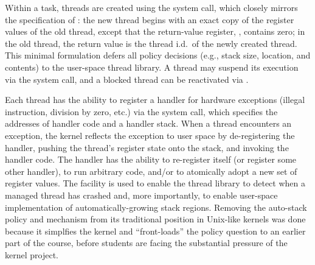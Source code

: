 Within a task, threads are created using the
 system call, which closely
mirrors the specification of :
the new thread begins with an exact copy of the
register values of the old thread, except that
the return-value register, , contains
zero;
in the old thread, the return value is the thread i.d.\
of the newly created thread.
This minimal formulation defers all policy decisions
(e.g., stack size, location, and contents) to the
user-space thread library.
A thread may suspend its execution via the
 system call,
and a blocked thread can be reactivated via
.

Each thread has the ability to register a handler
for hardware exceptions (illegal instruction,
division by zero, etc.)
via the  system call,
which specifies the addresses of handler code
and a handler stack.
When a thread encounters an exception,
the kernel reflects the exception to user space
by
de-registering the handler,
pushing the thread's register state onto the stack,
and invoking the handler code.
The handler has the ability to re-register itself
(or register some other handler),
to run arbitrary code,
and/or to atomically adopt a new set of register
values.
The  facility is used to enable
the thread library to detect when a managed
thread has crashed
and, more importantly,
to enable user-space
implementation of automatically-growing stack
regions.
Removing the auto-stack policy and mechanism from
its traditional position in Unix-like kernels
was done because it simplfies the kernel and
``front-loads'' the policy question to an earlier
part of the course,
before students are facing the substantial pressure
of the kernel project.
